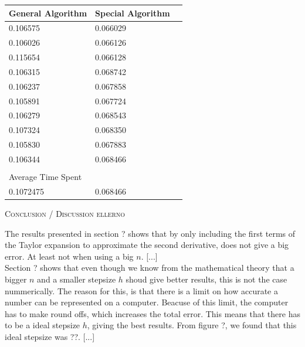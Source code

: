 \documentclass[a4paper,10pt]{article}
\begin{document}
\begin{table}[]  \label{fig:5}
\begin{tabular}{lll}
\hline
General Algorithm  & Special Algorithm \\
\hline
0.106575           & 0.066029                       \\
0.106026           & 0.066126                       \\
0.115654           & 0.066128                       \\
0.106315           & 0.068742                       \\
0.106237           & 0.067858                       \\
0.105891           & 0.067724                       \\
0.106279           & 0.068543                       \\
0.107324           & 0.068350                        \\
0.105830           & 0.067883                        \\
0.106344           & 0.068466                        \\
                   &                   &                  \\\hline
Average Time Spent &                                \\
\hline
0.1072475          & 0.068466                      
\end{tabular}
\end{table}


\begin{center}
\textsc{Conclusion / Discussion ellerno}
\end{center}
The results presented in section ? shows that by only including the first terms of the Taylor expansion to approximate the second derivative, does not give a big error. At least not when using a big $n$.  [...] \\

Section ? shows that even though we know from the mathematical theory that a bigger $n$ and a smaller stepsize $h$ shoud give better results, this is not the case nummerically. The reason for this, is that there is a limit on how accurate a number can be represented on a computer. Beacuse of this limit, the computer has to make round offs, which increases the total error. This means that there has to be a ideal stepsize $h$, giving the best results. From figure ?, we found that this ideal stepsize was ??. [...] \\
\end{document}
